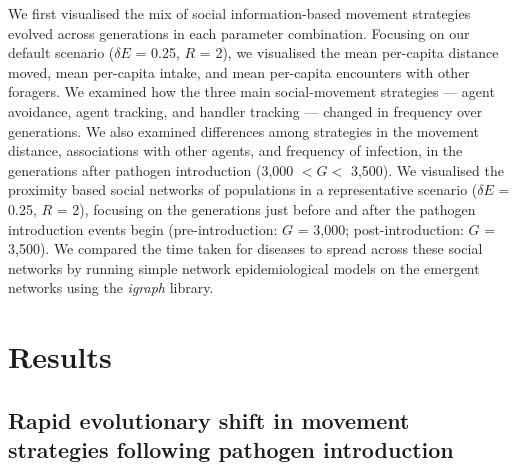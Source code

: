 We first visualised the mix of social information-based movement strategies evolved across generations in each parameter combination.
Focusing on our default scenario ($\delta E$ = 0.25, $R$ = 2), we visualised the mean per-capita distance moved, mean per-capita intake, and mean per-capita encounters with other foragers.
We examined how the three main social-movement strategies --- agent avoidance, agent tracking, and handler tracking --- changed in frequency over generations.
We also examined differences among strategies in the movement distance, associations with other agents, and frequency of infection, in the generations after pathogen introduction (3,000 $< G <$ 3,500).
We visualised the proximity based social networks of populations in a representative scenario ($\delta E$ = 0.25, $R$ = 2), focusing on the generations just before and after the pathogen introduction events begin (pre-introduction: $G$ = 3,000; post-introduction: $G$ = 3,500).
We compared the time taken for diseases to spread across these social networks by running simple network epidemiological models on the emergent networks \citep{bailey1975,white2017,stroeymeyt2018} using the \textit{igraph} \citep{csardi2006} library.

\section*{Results}

\subsection*{Rapid evolutionary shift in movement strategies following pathogen introduction}

